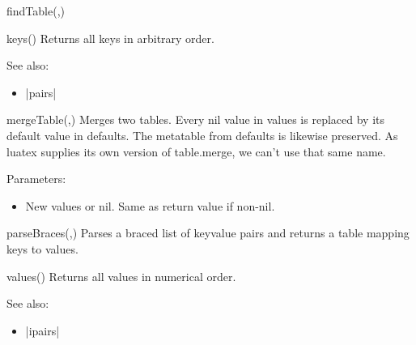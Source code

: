 \begin{luacommand}{{findTable}(,)}
\end{luacommand}\begin{luacommand}{{keys}()}
Returns all keys in arbitrary order.



See also:
\begin{itemize}
	\item[] |pairs|
\end{itemize}

\end{luacommand}\begin{luacommand}{{mergeTable}(,)}
Merges two tables. Every nil value in values is replaced by its default value in defaults.  The metatable from defaults is likewise preserved. As luatex supplies its own version of table.merge, we can't use that same name.

Parameters:
\begin{itemize}
	\item[]  \subitem New values or nil.  Same as return value if non-nil.
\end{itemize}



\end{luacommand}\begin{luacommand}{{parseBraces}(,)}
Parses a braced list of {key}{value} pairs and returns a table mapping keys to values.



\end{luacommand}\begin{luacommand}{{values}()}
Returns all values in numerical order.



See also:
\begin{itemize}
	\item[] |ipairs|
\end{itemize}

\end{luacommand}

